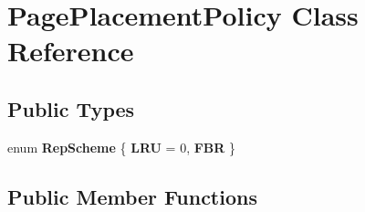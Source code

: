 \hypertarget{classPagePlacementPolicy}{\section{Page\-Placement\-Policy Class Reference}
\label{classPagePlacementPolicy}
}
\subsection*{Public Types}
\begin{DoxyCompactItemize}
\item 
enum {\bfseries Rep\-Scheme} \{ {\bfseries L\-R\-U} = 0, 
{\bfseries F\-B\-R}
 \}
\end{DoxyCompactItemize}
\subsection*{Public Member Functions}
